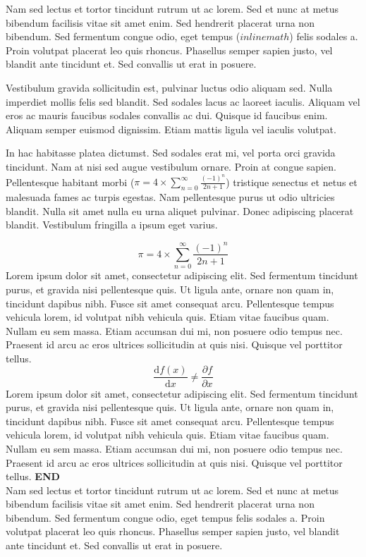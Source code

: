 \documentclass{report}
\begin{document}
Nam sed lectus et tortor tincidunt rutrum ut ac lorem. Sed et nunc at metus bibendum facilisis vitae sit amet enim. Sed hendrerit placerat urna non bibendum. Sed fermentum congue odio, eget tempus ($inline math$) felis sodales a. Proin volutpat placerat leo quis rhoncus. Phasellus semper sapien justo, vel blandit ante tincidunt et. Sed convallis ut erat in posuere.

Vestibulum gravida sollicitudin est, pulvinar luctus odio aliquam sed. Nulla imperdiet mollis felis sed blandit. Sed sodales lacus ac laoreet iaculis. Aliquam vel eros ac mauris faucibus sodales convallis ac dui. Quisque id faucibus enim. Aliquam semper euismod dignissim. Etiam mattis ligula vel iaculis volutpat.

In hac habitasse platea dictumst. Sed sodales erat mi, vel porta orci gravida tincidunt. Nam at nisi sed augue vestibulum ornare. Proin at congue sapien. Pellentesque habitant morbi ($\pi = 4 \times \sum _{n=0} ^{\infty} \frac{(-1)^n}{2n+1}$) tristique senectus et netus et malesuada fames ac turpis egestas. Nam pellentesque purus ut odio ultricies blandit. Nulla sit amet nulla eu urna aliquet pulvinar. Donec adipiscing placerat blandit. Vestibulum fringilla a ipsum eget varius.

$$\pi = 4 \times \sum _{n=0} ^{\infty} \frac{(-1)^n}{2n+1}$$
Lorem ipsum dolor sit amet, consectetur adipiscing elit. Sed fermentum tincidunt purus, et gravida nisi pellentesque quis. Ut ligula ante, ornare non quam in, tincidunt dapibus nibh. Fusce sit amet consequat arcu. Pellentesque tempus vehicula lorem, id volutpat nibh vehicula quis. Etiam vitae faucibus quam. Nullam eu sem massa. Etiam accumsan dui mi, non posuere odio tempus nec. Praesent id arcu ac eros ultrices sollicitudin at quis nisi. Quisque vel porttitor tellus.
$$\frac{\mathrm{d}f(x)}{\mathrm{d} x} \neq \frac{{\partial}f}{{\partial} x}$$
Lorem ipsum dolor sit amet, consectetur adipiscing elit. Sed fermentum tincidunt purus, et gravida nisi pellentesque quis. Ut ligula ante, ornare non quam in, tincidunt dapibus nibh. Fusce sit amet consequat arcu. Pellentesque tempus vehicula lorem, id volutpat nibh vehicula quis. Etiam vitae faucibus quam. Nullam eu sem massa. Etiam accumsan dui mi, non posuere odio tempus nec. Praesent id arcu ac eros ultrices sollicitudin at quis nisi. Quisque vel porttitor tellus. \textbf{END} \\
Nam sed lectus et tortor tincidunt rutrum ut ac lorem. Sed et nunc at metus bibendum facilisis vitae sit amet enim. Sed hendrerit placerat urna non bibendum. Sed fermentum congue odio, eget tempus felis sodales a. Proin volutpat placerat leo quis rhoncus. Phasellus semper sapien justo, vel blandit ante tincidunt et. Sed convallis ut erat in posuere.
\end{document}

